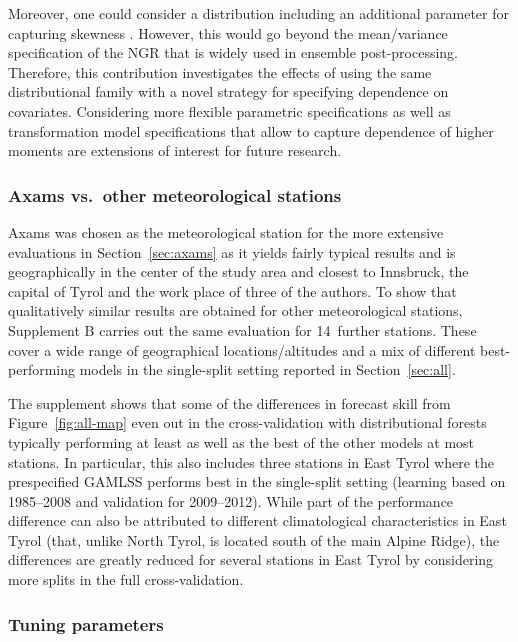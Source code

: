 \documentclass[aoas, preprint]{imsart}
\numberwithin{equation}{subsection}
\begin{document}
Moreover, one could consider a distribution including an additional parameter
for capturing skewness \citep[as in][]{Scheuerer+Hamill:2015, Baran+Nemoda:2016}. 
However, this would go beyond the mean/variance specification of the NGR
that is widely used in ensemble post-processing. Therefore, this contribution
investigates the effects of using the same distributional family with a novel
strategy for specifying dependence on covariates. Considering more flexible
parametric specifications as well as transformation model specifications that
allow to capture dependence of higher moments \citep[see e.g.,][]{Hothorn+Zeileis:2017}
are extensions of interest for future research.


\subsubsection*{Axams vs.~other meteorological stations}

Axams was chosen as the meteorological station for the more extensive evaluations
in Section~\ref{sec:axams} as it yields fairly typical results
and is geographically in the center of the study area and closest to
Innsbruck, the capital of Tyrol and the work place of three of the authors.
To show that qualitatively similar results are obtained for other
meteorological stations, Supplement B \citep{Schlosser+Hothorn+Stauffer:2018b}
carries out the same evaluation for 14~further stations. These
cover a wide range of geographical locations/altitudes and a mix of
different best-performing models in the single-split setting reported in
Section~\ref{sec:all}.

The supplement shows that some of the differences in forecast skill from
Figure~\ref{fig:all-map} even out in the cross-validation with distributional
forests typically performing at least as well as the best of the other models at most
stations. In particular, this also includes three stations in East Tyrol
where the prespecified GAMLSS performs best in the single-split setting
(learning based on 1985--2008 and validation for 2009--2012). While part of
the performance difference can also be attributed to different
climatological characteristics in East Tyrol (that, unlike North Tyrol, is located
south of the main Alpine Ridge), the differences are greatly reduced for several
stations in East Tyrol by considering more splits in the full cross-validation.



\subsubsection*{Tuning parameters}
\end{document}
